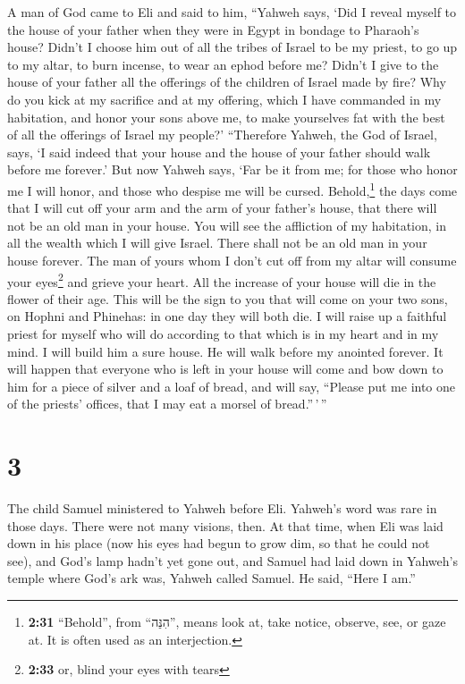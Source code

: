 A man of God came to Eli and said to him, ``Yahweh says,
`Did I reveal myself to the house of your father when they were in Egypt
in bondage to Pharaoh's house?  Didn't I choose him out
of all the tribes of Israel to be my priest, to go up to my altar, to
burn incense, to wear an ephod before me? Didn't I give to the house of
your father all the offerings of the children of Israel made by fire?
 Why do you kick at my sacrifice and at my offering,
which I have commanded in my habitation, and honor your sons above me,
to make yourselves fat with the best of all the offerings of Israel my
people?'  ``Therefore Yahweh, the God of Israel, says, `I
said indeed that your house and the house of your father should walk
before me forever.' But now Yahweh says, `Far be it from me; for those
who honor me I will honor, and those who despise me will be cursed.
 Behold,\footnote{\textbf{2:31} ``Behold'', from
  ``הִנֵּה'', means look at, take notice, observe, see, or gaze at. It
  is often used as an interjection.} the days come that I will cut off
your arm and the arm of your father's house, that there will not be an
old man in your house.  You will see the affliction of my
habitation, in all the wealth which I will give Israel. There shall not
be an old man in your house forever.  The man of yours
whom I don't cut off from my altar will consume your eyes\footnote{\textbf{2:33}
  or, blind your eyes with tears} and grieve your heart. All the
increase of your house will die in the flower of their age.
 This will be the sign to you that will come on your two
sons, on Hophni and Phinehas: in one day they will both die.
 I will raise up a faithful priest for myself who will do
according to that which is in my heart and in my mind. I will build him
a sure house. He will walk before my anointed forever. 
It will happen that everyone who is left in your house will come and bow
down to him for a piece of silver and a loaf of bread, and will say,
``Please put me into one of the priests' offices, that I may eat a
morsel of bread.''\,'\,''

\hypertarget{section-2}{%
\section{3}\label{section-2}}

 The child Samuel ministered to Yahweh before Eli.
Yahweh's word was rare in those days. There were not many visions, then.
 At that time, when Eli was laid down in his place (now
his eyes had begun to grow dim, so that he could not see),
 and God's lamp hadn't yet gone out, and Samuel had laid
down in Yahweh's temple where God's ark was,  Yahweh
called Samuel. He said, ``Here I am.''

